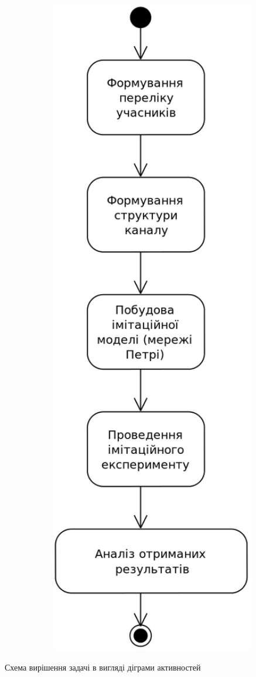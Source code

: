             \begin{stdfigure}
                \includegraphics[width=7in]{images/uml_act_solution_schema.png}
                \caption{Схема вирішення задачі в вигляді діграми активностей}
                \label{fig:solution_schema}
            \end{stdfigure}   
